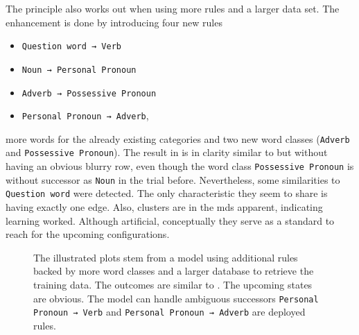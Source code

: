 \bigskip
The principle also works out when using more rules and a larger data set. The enhancement is done by introducing four new rules
\begin{itemize}
	\item \texttt{Question word → Verb}
	\item \texttt{Noun → Personal Pronoun}
	\item \texttt{Adverb → Possessive Pronoun}
	\item \texttt{Personal Pronoun → Adverb},
\end{itemize}
more words for the already existing categories and two new word classes (\texttt{Adverb} and \texttt{Possessive Pronoun}). The result in \figref{\ref{fig: more rules and word tpm and mds}} is in clarity similar to \figref{\ref{fig: first model tpm and mds}} but without having an obvious blurry row, even though the word class \texttt{Possessive Pronoun} is without successor as \texttt{Noun} in the trial before. Nevertheless, some similarities to \texttt{Question word} were detected. The only characteristic they seem to share is having exactly one edge. Also, clusters are in the \gls{mds} apparent, indicating learning worked. Although artificial, conceptually they serve as a standard to reach for the upcoming configurations.
\begin{figure}
	\centering
		\hfill
	\caption{The illustrated plots stem from a model using additional rules backed by more word classes and a larger database to retrieve the training data. The outcomes are similar to \figref{\ref{fig: first model tpm and mds}}. The upcoming states are obvious. The model can handle ambiguous successors \eg \texttt{Personal Pronoun → Verb} and \texttt{Personal Pronoun → Adverb} are deployed rules.}
	\label{fig: more rules and word tpm and mds}
\end{figure}
